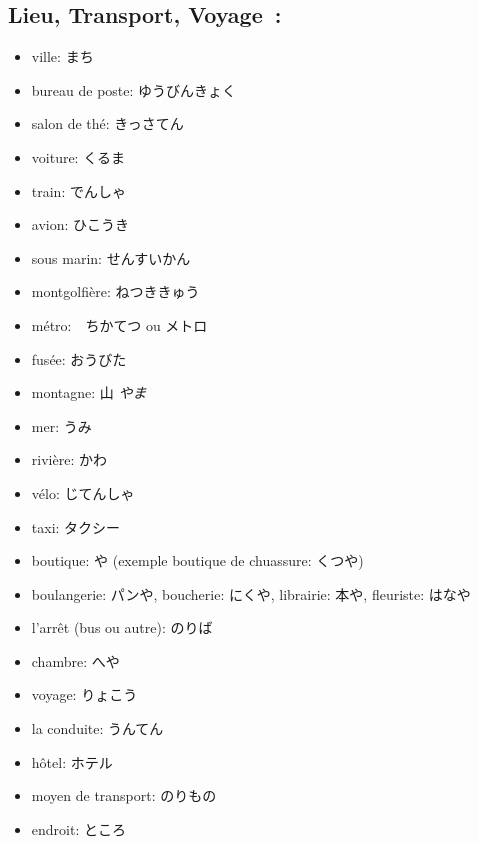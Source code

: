 \documentclass{article}
\begin{document}
\begin{CJK}{UTF8}{min}
   \subsection{Lieu, Transport, Voyage~:}
   \begin{itemize}
       \item ville: まち
        \item bureau de poste: ゆうびんきょく
        \item salon de thé: きっさてん
        \item voiture: くるま
        \item train: でんしゃ
        \item avion: ひこうき
        \item sous marin: せんすいかん
        \item montgolfière: ねつききゅう
        \item métro:　ちかてつ ou メトロ
        \item fusée: おうびた
        \item montagne: 山 \textit{やま}
        \item mer: うみ
        \item rivière: かわ
        \item vélo: じてんしゃ
        \item taxi: タクシー
        \item boutique: や (exemple boutique de chuassure: くつや)
        \item boulangerie: パンや, boucherie: にくや, librairie: 本や, fleuriste: はなや
        \item l'arrêt (bus ou autre): のりば
        \item chambre: へや
        \item voyage: りょこう
        \item la conduite: うんてん
        \item hôtel: ホテル
        \item moyen de transport: のりもの
        \item endroit: ところ
   \end{itemize}


\end{CJK}
\end{document}
